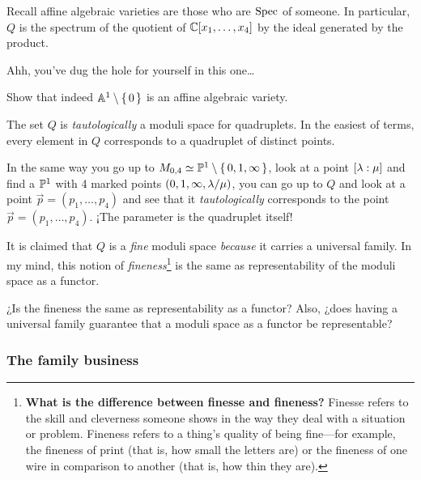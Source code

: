 \documentclass[12pt]{memoir}
\begin{document}
\begin{Rmk}
    Recall affine algebraic varieties are those who are $\operatorname{Spec}$ of someone. In particular, $Q$ is the spectrum of the quotient of $\mathbb{C}[x_1,\dots,x_4]$ by the ideal generated by the product.
\end{Rmk}

Ahh, you've dug the hole for yourself in this one\dots

\begin{Ej}
    Show that indeed $\mathbb{A}^1\setminus\{\,0\,\}$ is an affine algebraic variety.
\end{Ej}

The set $Q$ is \emph{tautologically} a moduli space for quadruplets. In the easiest of terms, every element in $Q$ corresponds to a quadruplet of distinct points.\par
In the same way you go up to $M_{0,4}\simeq\mathbb{P}^1\setminus\{\,0,1,\infty\,\}$, look at a point $[\lambda:\mu]$ and find a $\mathbb{P}^1$ with 4 marked points $(0,1,\infty,\lambda/\mu)$, you can go up to $Q$ and look at a point $\vec{p}=(p_1,\dots,p_4)$ and see that it \emph{tautologically} corresponds to the point $\vec p=(p_1,\dots,p_4)$. ¡The parameter is the quadruplet itself!\par 
It is claimed that $Q$ is a \emph{fine} moduli space \emph{because} it carries a universal family. In my mind, this notion of \emph{fineness}\footnote{\textbf{What is the difference between finesse and fineness?}
Finesse refers to the skill and cleverness someone shows in the way they deal with a situation or problem. Fineness refers to a thing's quality of being fine—for example, the fineness of print (that is, how small the letters are) or the fineness of one wire in comparison to another (that is, how thin they are).} is the same as representability of the moduli space as a functor. 

\begin{Ej}
    ¿Is the fineness the same as representability as a functor? Also, ¿does having a universal family guarantee that a moduli space as a functor be representable?
\end{Ej}

\subsubsection{The family business}
\end{document}
